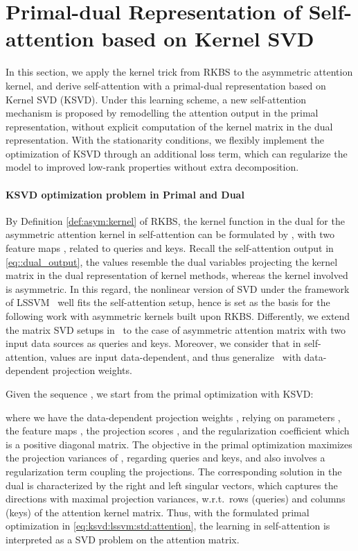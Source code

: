 \documentclass{article}
\begin{document}
	\section{Primal-dual Representation of Self-attention based on Kernel SVD}
	\label{sec::primal_dual}
	In this section, we apply the kernel trick from RKBS to the asymmetric attention kernel, and derive self-attention with a primal-dual representation based on 
	Kernel SVD (KSVD). 
	Under this learning scheme, a new self-attention mechanism is proposed by remodelling the attention output in the primal representation, without explicit computation of the kernel matrix in the dual representation. 
	With the stationarity conditions, we flexibly implement the optimization of KSVD through an additional loss term, which can regularize the model to improved low-rank properties without extra decomposition.
	
	\paragraph{{KSVD optimization problem} in Primal and Dual}
	By Definition \ref{def:asym:kernel} of RKBS, the kernel function in the dual for the asymmetric attention kernel  in self-attention can be formulated by 
	,
	with two feature maps ,  related to queries and keys. 
	Recall the self-attention output in \eqref{eq::dual_output}, the values { resemble the dual variables} projecting the kernel matrix in the dual representation of kernel methods, whereas the kernel involved is asymmetric.
	In this regard, the nonlinear version of SVD under the framework of LSSVM~\cite{suykens2016svd} well fits the self-attention setup, hence is set as the basis for the following work with asymmetric kernels built upon RKBS. 
	{Differently, we extend the matrix SVD setups in~\cite{suykens2016svd} to the case of asymmetric attention matrix with two input data sources as queries and keys.} 
	Moreover,  we consider that in self-attention, values are input data-dependent, and thus generalize~\cite{suykens2016svd} with data-dependent projection weights.
	
	Given the sequence  , we start from the  primal optimization with KSVD:
	
	where we have the data-dependent projection weights ,  relying on parameters , 
	the feature maps
	, 
	the projection scores ,
	and the regularization coefficient  which is a positive diagonal matrix. The objective  in the primal optimization 
	maximizes the projection variances of ,  regarding queries and keys, and also involves a regularization term coupling the projections.
	The corresponding solution in the dual is characterized
	by the right and left singular vectors, which captures the directions with maximal projection variances, w.r.t.~rows (queries) and columns (keys) of the attention kernel matrix.
	Thus, with the formulated primal optimization in \eqref{eq:ksvd:lssvm:std:attention},  the learning in self-attention is interpreted  as a SVD problem on the attention matrix.
	
\end{document}
